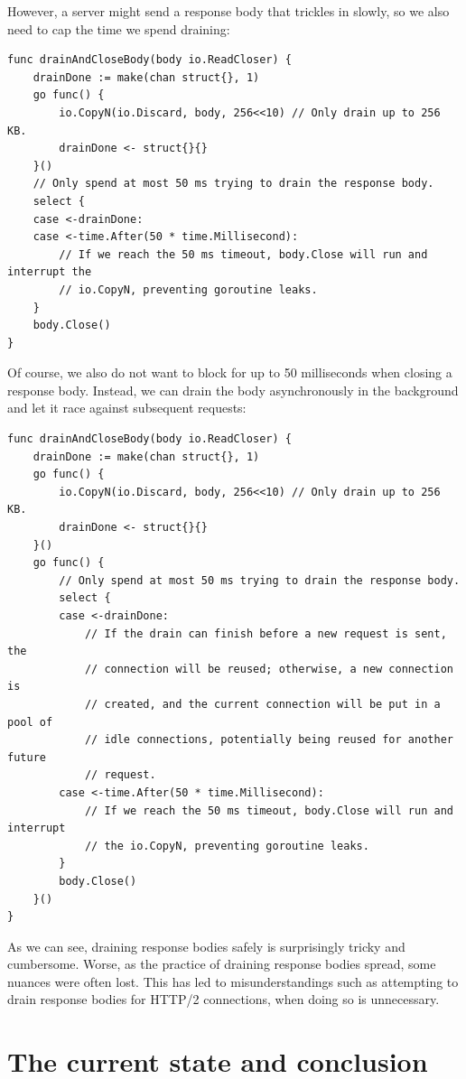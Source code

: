 \documentclass[11pt,a4paper]{article}
\begin{document}
However, a server might send a response body that trickles in slowly, so we also need to cap the time we spend draining:

\begin{verbatim}
func drainAndCloseBody(body io.ReadCloser) {
    drainDone := make(chan struct{}, 1)
    go func() {
        io.CopyN(io.Discard, body, 256<<10) // Only drain up to 256 KB.
        drainDone <- struct{}{}
    }()
    // Only spend at most 50 ms trying to drain the response body.
    select {
    case <-drainDone:
    case <-time.After(50 * time.Millisecond):
        // If we reach the 50 ms timeout, body.Close will run and interrupt the
        // io.CopyN, preventing goroutine leaks.
    }
    body.Close()
}
\end{verbatim}

Of course, we also do not want to block for up to 50 milliseconds when closing a response body. Instead, we can drain the body asynchronously in the background and let it race against subsequent requests:

\begin{verbatim}
func drainAndCloseBody(body io.ReadCloser) {
    drainDone := make(chan struct{}, 1)
    go func() {
        io.CopyN(io.Discard, body, 256<<10) // Only drain up to 256 KB.
        drainDone <- struct{}{}
    }()
    go func() {
        // Only spend at most 50 ms trying to drain the response body.
        select {
        case <-drainDone:
            // If the drain can finish before a new request is sent, the
            // connection will be reused; otherwise, a new connection is
            // created, and the current connection will be put in a pool of
            // idle connections, potentially being reused for another future
            // request.
        case <-time.After(50 * time.Millisecond):
            // If we reach the 50 ms timeout, body.Close will run and interrupt
            // the io.CopyN, preventing goroutine leaks.
        }
        body.Close()
    }()
}
\end{verbatim}

As we can see, draining response bodies safely is surprisingly tricky and cumbersome. Worse, as the practice of draining response bodies spread, some nuances were often lost. This has led to misunderstandings such as attempting to drain response bodies for HTTP/2 connections, when doing so is unnecessary.

\section{The current state and conclusion}
\end{document}
